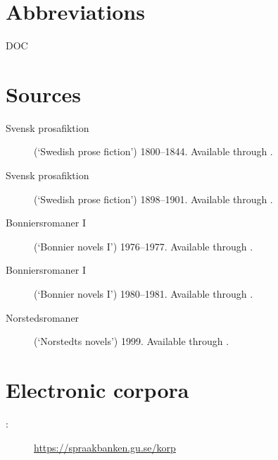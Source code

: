 \documentclass[output=paper]{langscibook}
\begin{document}
\section*{Abbreviations}


DOC  


\section*{Sources}

\begin{description}
\item[Svensk prosafiktion] (`Swedish prose fiction') 1800–1844. Available through .
\item[Svensk prosafiktion] (`Swedish prose fiction') 1898–1901. Available through .
\item[Bonniersromaner I]   (`Bonnier novels I') 1976–1977. Available through .
\item[Bonniersromaner I]   (`Bonnier novels I') 1980–1981. Available through .
\item[Norstedsromaner]     (`Norstedts novels') 1999. Available through .
\end{description}

\section*{Electronic corpora}

\begin{description}
\item[:] \url{https://spraakbanken.gu.se/korp}
\end{description}

{\sloppy\printbibliography[heading=subbibliography,notkeyword=this]}
\end{document}
